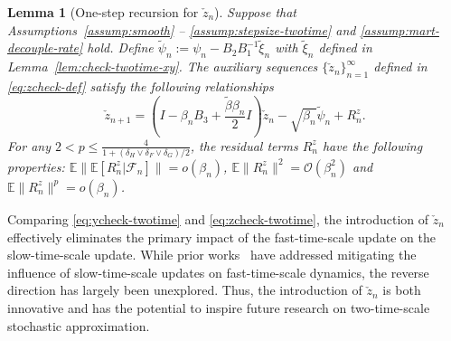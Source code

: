 \documentclass[11pt]{article}
\theoremstyle{plain}
\newtheorem{lem}{Lemma}[section]
\theoremstyle{definition}
\def\Hsmooth{{\delta_H}}
\def\Fsmooth{{\delta_F}}
\def\Gsmooth{{\delta_G}}
\def\invdiffslow{\tilde{\beta}}
\def\mI{{\bm{I}}}
\def\FM{{\mathcal F}}
\def\OM{{\mathcal O}}
\def\EB{{\mathbb E}}
\newcommand{\xcheck}{{\check{x}}}
\newcommand{\ycheck}{{\check{y}}}
\newcommand{\zcheck}{{\check{z}}}
\def\mI{{I}}
\begin{document}
\begin{lem}[One-step recursion for $\zcheck_{n}$]\label{lem:check-twotime-z}
	Suppose that Assumptions~\ref{assump:smooth} -- \ref{assump:stepsize-twotime} and \ref{assump:mart-decouple-rate} hold.
	Define 
	$\tilde{\psi}_{n} := \psi_{n} - B_2 B_1^{-1} \tilde{\xi}_n$ with $\tilde{\xi}_{n}$ defined in Lemma~\ref{lem:check-twotime-xy}. The auxiliary sequences $\{ \zcheck_{n} \}_{n=1}^\infty$ defined in \eqref{eq:zcheck-def} satisfy the following relationships  
	\begin{equation}
		\zcheck_{n+1} = \left( \mI - \beta_{n} B_3 + \frac{\invdiffslow \beta_{n}}{2} \mI \right) \zcheck_{n} - \sqrt{\beta_{n}} \tilde{\psi}_{n} + R_{n}^z. \label{eq:zcheck-twotime}
	\end{equation}
	For any $2 < p \le \frac{4}{1 + ( \Hsmooth \vee \Fsmooth \vee \Gsmooth )/2} $, 
	the residual terms $R_{n}^z$ have the following properties:
		$\EB \| \EB [ R_{n}^z | \FM_n ] \| = o(\beta_{n} ) $, $\EB \| R_{n}^z \|^2 = \OM(\beta_{n}^2 )$ and $\EB \| R_{n}^z \|^p = o(\beta_{n})$.
\end{lem}

Comparing \eqref{eq:ycheck-twotime} and \eqref{eq:zcheck-twotime}, the introduction of  $\zcheck_{n}$ effectively eliminates the primary impact of the fast-time-scale update on the slow-time-scale update. While prior works~\citep{konda2004convergence, kaledin2020finite} have addressed mitigating the influence of slow-time-scale updates on fast-time-scale dynamics, the reverse direction has largely been unexplored. Thus, the introduction of $\zcheck_{n}$  is both innovative and has the potential to inspire future research on two-time-scale stochastic approximation.
\end{document}
